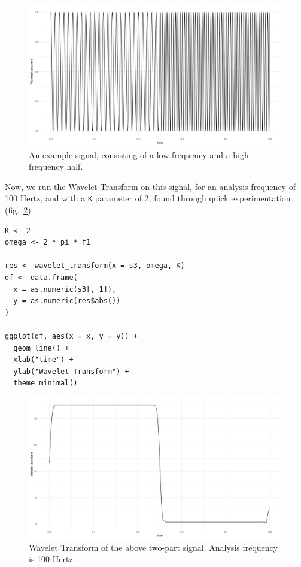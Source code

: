 \documentclass[
  letterpaper,
]{krantz}
\begin{document}
\begin{figure}[H]

{\centering \includegraphics{images/wav-signal-short.png}

}

\caption{\label{fig-wav-signal-short}An example signal, consisting of a
low-frequency and a high-frequency half.}

\end{figure}

Now, we run the Wavelet Transform on this signal, for an analysis
frequency of 100 Hertz, and with a \texttt{K} parameter of 2, found
through quick experimentation
(fig.~\ref{fig-wav-signal-short-transform}):

\begin{verbatim}
K <- 2
omega <- 2 * pi * f1

res <- wavelet_transform(x = s3, omega, K)
df <- data.frame(
  x = as.numeric(s3[, 1]),
  y = as.numeric(res$abs())
)

ggplot(df, aes(x = x, y = y)) +
  geom_line() +
  xlab("time") +
  ylab("Wavelet Transform") +
  theme_minimal()
\end{verbatim}

\begin{figure}[H]

{\centering \includegraphics{images/wav-signal-short-transform.png}

}

\caption{\label{fig-wav-signal-short-transform}Wavelet Transform of the
above two-part signal. Analysis frequency is 100 Hertz.}

\end{figure}
\end{document}
